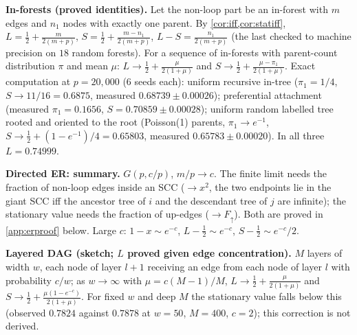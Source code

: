 \textbf{In-forests (proved identities).} Let the non-loop part be an in-forest
with $m$ edges and $n_1$ nodes with exactly one parent. By
\cref{cor:iff,cor:statiff},
$L=\tfrac12+\frac{m}{2(m+p)}$, $S=\tfrac12+\frac{m-n_1}{2(m+p)}$,
$L-S=\frac{n_1}{2(m+p)}$ (the last checked to machine precision on $18$ random
forests). For a sequence of in-forests with parent-count distribution $\pi$ and
mean $\mu$: $L\to\tfrac12+\frac\mu{2(1+\mu)}$ and
$S\to\tfrac12+\frac{\mu-\pi_1}{2(1+\mu)}$. Exact computation at $p=20{,}000$
(6 seeds each): uniform recursive in-tree ($\pi_1=1/4$, $S\to11/16=0.6875$,
measured $0.68739\pm0.00026$); preferential attachment (measured $\pi_1=0.1656$,
$S=0.70859\pm0.00028$); uniform random labelled tree rooted and oriented to the
root (Poisson(1) parents, $\pi_1\to e^{-1}$, $S\to\tfrac12+(1-e^{-1})/4=0.65803$,
measured $0.65783\pm0.00020$). In all three $L=0.74999$.

\textbf{Directed ER: summary.} $G(p,c/p)$, $m/p\to c$. The finite limit needs
the fraction of non-loop edges inside an SCC ($\to x^2$, the two endpoints lie in
the giant SCC iff the ancestor tree of $i$ and the descendant tree of $j$ are
infinite); the stationary value needs the fraction of up-edges
($\to F_\uparrow$). Both are proved in \cref{app:erproof} below. Large $c$:
$1-x\sim e^{-c}$, $L-\tfrac12\sim e^{-c}$, $S-\tfrac12\sim e^{-c}/2$.

\textbf{Layered DAG (sketch; $L$ proved given edge concentration).} $M$ layers of
width $w$, each node of layer $l+1$ receiving an edge from each node of layer $l$
with probability $c/w$; as $w\to\infty$ with $\mu=c(M-1)/M$,
$L\to\tfrac12+\frac\mu{2(1+\mu)}$ and
$S\to\tfrac12+\frac{\mu(1-e^{-c})}{2(1+\mu)}$. For fixed $w$ and deep $M$ the
stationary value falls below this (observed $0.7824$ against $0.7878$ at
$w=50$, $M=400$, $c=2$); this correction is not derived.

